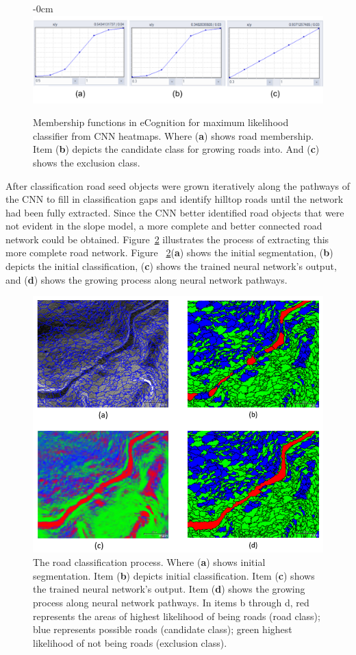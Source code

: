 \documentclass[remotesensing,article,submit,pdftex,moreauthors]{Definitions/mdpi}
\begin{document}
\begin{figure}[H]
\begin{adjustwidth}{-\extralength}{0cm}
\centering
\includegraphics[width=15.5cm]{membership.png}
\end{adjustwidth}
\caption{Membership functions in eCognition for maximum likelihood classifier from CNN heatmaps. Where (\textbf{a}) shows road membership. Item (\textbf{b}) depicts the candidate class for growing roads into. And (\textbf{c}) shows the exclusion class. \label{fig6}}
\end{figure}  

After classification road seed objects were grown iteratively along the pathways of the CNN to fill in classification gaps and identify hilltop roads until the network had been fully extracted. Since the CNN better identified road objects that were not evident in the slope model, a more complete and better connected road network could be obtained. Figure~\ref{fig7} illustrates the process of extracting this more complete road network. Figure ~\ref{fig7}(\textbf{a}) shows the initial segmentation, (\textbf{b}) depicts the initial classification, (\textbf{c}) shows the trained neural network's output, and (\textbf{d}) shows the growing process along neural network pathways. 

\begin{figure}[H]
\includegraphics[width=10.5 cm]{classify.png}
\caption{ The road classification process. Where (\textbf{a}) shows initial segmentation. Item (\textbf{b}) depicts initial classification. Item (\textbf{c}) shows the trained neural network's output. Item (\textbf{d}) shows the growing process along neural network pathways. In items b through d, red represents the areas of highest likelihood of being roads (road class); blue represents possible roads (candidate class); green highest likelihood of not being roads (exclusion class).}\label{fig7}
\end{figure}
\end{document}
